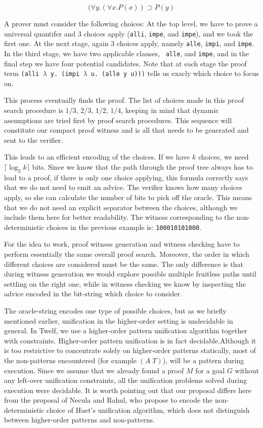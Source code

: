 \documentclass{acmconf}
\newcommand{\impl}{\supset}
\begin{document}
\[
(\forall y. (\forall x.P(x)) \impl P(y)
\]

A prover must consider the following choices: At the top level, we
have to prove a universal quantifer and 3 choices apply ({\tt alli},
{\tt impe}, and {\tt impe}), and we took the first one. At the next
stage, again 3 choices apply, namely {\tt alle}, {\tt   impi}, and
{\tt impe}. In the third stage, we have two applicable clauses, {\tt
  alle}, and {\tt impe}, and in the final step we have four potential
candidates. Note that at each stage the proof term {\tt (alli
  $\lambda$ y. (impi $\lambda$ u. (alle y u)))} tells us exacly which
choice to focus on.

This process eventually finds the proof. The list of
choices made in this proof search procedure is $1/3$, $2/3$, $1/2$,
$1/4$, keeping in mind that dynamic assumptions are tried first by
proof search procedures. This sequence will constitute our compact
proof witness and is all that needs to be generated and sent to the
verifier.  

This leads to an efficient encoding of the choices. If we have $k$
choices, we need $\lceil\log_2 k\rceil$ bits. Since we know that the
path through the proof tree always has to lead to a proof, if there is
only one choice applying, this formula correctly says that we do not
need to emit an advice.  The verifier knows how many choices apply, so
she can calculate the number of bits to pick off the oracle. This
means that we do not need an explicit separator between the choices,
although we include them here for better readability.
The witness corresponding to the non-deterministic choices in the
previous example is: {\tt 100010101000}.

For the idea to work, proof witness generation and witness checking
have to perform essentially the same overall proof search. Moreover,
the order in which different choices are considered must be the same.
The only difference is that during witness generation we would explore
possible multiple fruitless paths until settling on the right one,
while in witness checking we know by inspecting the advice encoded in
the bit-string which choice to consider.

The oracle-string encodes one type of possible choices, but as we
briefly mentioned earlier, unification in the higher-order setting is
undecidable in general. In Twelf, we use a higher-order pattern
unification algorithm together with constraints. Higher-order pattern
unification is in fact decidable.Although it is too restrictive to
concentrate solely on higher-order patterns statically, 
most of the non-patterns encountered (for example $(A\;T)$), will be a
pattern during execution. Since we assume that we already found a proof $M$
for a goal $G$ without any left-over unification constraints, 
all the unification problems solved during execution were
decidable. It is worth pointing out that our proposal differs here
from the proposal of Necula and Rahul, who propose to encode the
non-deterministic choice of Huet's unification algorithm, which does
not distinguish between higher-order patterns and non-patterns. 
\end{document}
